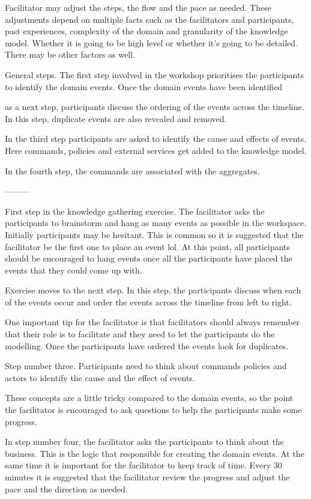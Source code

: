 \documentclass[a4paper, 11pt]{book}
\begin{document}
    Facilitator may adjust the steps, the flow and the pace as needed.
    These adjustments depend on multiple facts such as the facilitators and participants, past experiences, complexity of the domain and granularity of the knowledge model.
    Whether it is going to be high level or whether it's going to be detailed.
    There may be other factors as well.

    General steps.
    The first step involved in the workshop prioritises the participants to identify the domain events.
    Once the domain events have been identified

    as a next step, participants discuss the ordering of the events across the timeline.
    In this step, duplicate events are also revealed and removed.

    In the third step participants are asked to identify the cause and effects of events.
    Here commands, policies and external services get added to the knowledge model.

    In the fourth step, the commands are associated with the aggregates.

    ---------

    First step in the knowledge gathering exercise.
    The facilitator asks the participants to brainstorm and hang as many events as possible in the workspace.
    Initially participants may be hesitant.
    This is common so it is suggested that the facilitator be the first one to place an event lol.
    At this point, all participants should be encouraged to hang events once all the participants have placed the events that they could come up with.

    Exercise moves to the next step.
    In this step, the participants discuss when each of the events occur and order the events across the timeline from left to right.

    One important tip for the facilitator is that facilitators should always remember that their role is to facilitate and they need to let the participants do the modelling.
    Once the participants have ordered the events look for duplicates.

    Step number three.
    Participants need to think about commands policies and actors to identify the cause and the effect of events.

    These concepts are a little tricky compared to the domain events, so the point the facilitator is encouraged to ask questions to help the participants make some progress.

    In step number four, the facilitator asks the participants to think about the business.
    This is the logic that responsible for creating the domain events.
    At the same time it is important for the facilitator to keep track of time.
    Every 30 minutes it is suggested that the facilitator review the progress and adjust the pace and the direction as needed.
\end{document}
